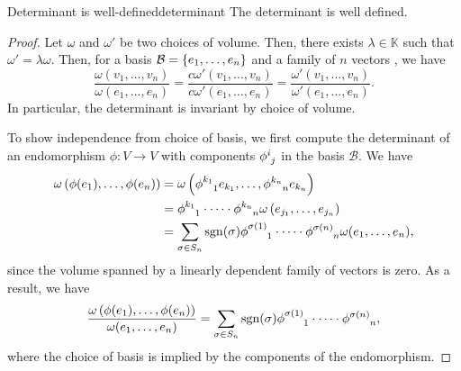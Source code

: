\begin{proposition}{Determinant is well-defined}{determinant}
    The determinant is well defined.
\end{proposition}
\begin{proof}
    Let \(\omega\) and \(\omega'\) be two choices of volume. Then, there exists \(\lambda \in \mathbb{K}\) such that \(\omega' = \lambda \omega\). Then, for a basis \(\mathcal{B} = \{e_1, \dots, e_n\}\) and a family of \(n\) vectors , we have
    \begin{equation*}
        \frac{\omega(v_1, \dots, v_n)}{\omega(e_1, \dots, e_n)} = \frac{c\omega'(v_1, \dots, v_n)}{c\omega'(e_1, \dots, e_n)} = \frac{\omega'(v_1, \dots, v_n)}{\omega'(e_1, \dots, e_n)}.
    \end{equation*}
    In particular, the determinant is invariant by choice of volume.

    To show independence from choice of basis, we first compute the determinant of an endomorphism \(\phi : V \to V\) with components \(\phi\indices{^i_j}\) in the basis \(\mathcal{B}.\) We have
    \begin{align*}
        \omega\left(\phi(e_1), \dots, \phi(e_n)\right) &= \omega\left(\phi\indices{^{k_1}_1}e_{k_1}, \dots, \phi\indices{^{k_n}_n} e_{k_n}\right)\\
                                                       &= \phi\indices{^{k_1}_{1}} \cdot \dots \cdot \phi\indices{^{k_n}_{n}} \omega\left(e_{j_1}, \dots, e_{j_n}\right)\\
                                                       &= \sum_{\sigma \in S_n} \sgn(\sigma)\phi\indices{^{\sigma(1)}_{1}}\cdot\dots\cdot\phi\indices{^{\sigma(n)}_{n}} \omega(e_1, \dots, e_n),
    \end{align*}
    since the volume spanned by a linearly dependent family of vectors is zero. As a result, we have
    \begin{equation*}
        \frac{\omega\left(\phi(e_1), \dots, \phi(e_n)\right)}{\omega(e_1, \dots, e_n)} = \sum_{\sigma \in S_n} \sgn(\sigma) \phi\indices{^{\sigma(1)}_1} \cdot \dots \cdot \phi\indices{^{\sigma(n)}_n},
    \end{equation*}
    where the choice of basis is implied by the components of the endomorphism.


\end{proof}
